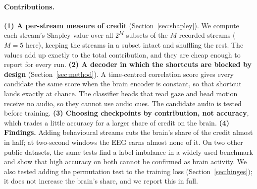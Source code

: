 \paragraph{Contributions.}
\textbf{(1) A per-stream measure of credit} (Section~\ref{sec:shapley}). We
compute each stream's Shapley value over all $2^M$ subsets of the $M$ recorded
streams ($M\!=\!5$ here), keeping the streams in a subset intact and shuffling
the rest.
The values add up exactly to the total contribution, and they are cheap enough
to report for every run.
\textbf{(2) A decoder in which the shortcuts are blocked by design}
(Section~\ref{sec:method}). A time-centred correlation score gives every
candidate the same score when the brain encoder is constant, so that shortcut
lands exactly at chance. The classifier heads that read gaze and head motion
receive no audio, so they cannot use audio cues. The candidate audio is tested before training.
\textbf{(3) Choosing checkpoints by contribution, not accuracy}, which trades a
little accuracy for a larger share of credit on the brain.
\textbf{(4) Findings.} Adding behavioural streams cuts the brain's share of the
credit almost in half; at two-second windows the EEG earns almost none of it.
On two other public datasets, the same tests find a label imbalance in a widely
used benchmark and show that high accuracy on both cannot be confirmed as brain
activity. We also tested adding the permutation test to the training loss
(Section~\ref{sec:hinges}); it does not increase the brain's share, and we report
this in full.
